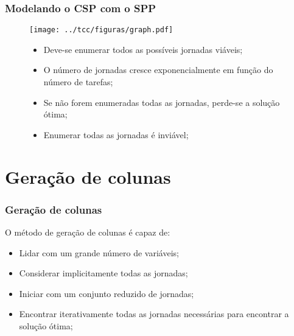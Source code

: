 \documentclass{beamer}
\begin{document}
\begin{frame}
    \frametitle{Modelando o CSP com o SPP}
    \begin{figure}[!htb]
        \centering
        \begin{minipage}{0.48\textwidth}
        {
            \centering
            \texttt{[image: ../tcc/figuras/graph.pdf]}
            \label{treta}
        }
        \end{minipage}
%
        \begin{minipage}{.48\textwidth}
            \begin{itemize}
                \item Deve-se enumerar todos as possíveis jornadas viáveis;
                \item O número de jornadas cresce exponencialmente em função do número de tarefas;
                \item Se não forem enumeradas todas as jornadas, perde-se a solução ótima;
                \item Enumerar todas as jornadas é inviável;
            \end{itemize}
        \end{minipage}
    \end{figure}
\end{frame}

\section{Geração de colunas}
\begin{frame}
    \frametitle{Geração de colunas}
    O método de geração de colunas é capaz de:

    \begin{itemize}
        \item Lidar com um grande número de variáveis;
        \item Considerar implicitamente todas as jornadas;
        \item Iniciar com um conjunto reduzido de jornadas;
        \item Encontrar iterativamente todas as jornadas necessárias para encontrar a solução ótima;
    \end{itemize}
\end{frame}
\end{document}
